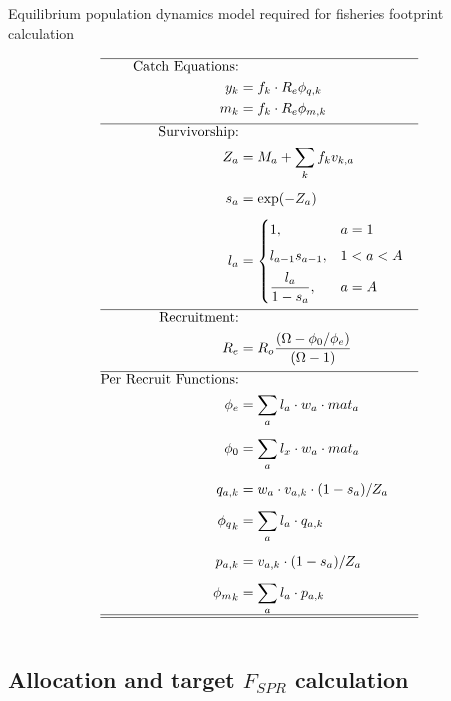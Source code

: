 \documentclass[12pt,letterpaper]{article}
\begin{document}
\begin{table}[h]
\centering
\caption{Equilibrium population dynamics model required for fisheries footprint calculation}\label{tab:equilibrium_model} 
\tableEq
	\large
    \begin{align}
           \hline
        \mbox{Catch Equations:} \nonumber \\
        	y_{k} &=  f_{k} \cdot R_{e} \phi_{q,k}  \label{T2.1}\\
        	m_{k} &=  f_{k} \cdot R_{e} \phi_{m,k}   \label{T2.2}\\[1ex]
        \hline
        \mbox{Survivorship:} \nonumber \\
        	Z_a &= M_a + \sum_k f_k v_{k,a} \label{T2.3}\\[1ex]
        	s_a &= \exp(-Z_a) \label{T2.4}\\[1ex]
        	l_a &= \begin{cases}
				1,  & a = 1\\[1ex]
				l_{a-1} s_{a-1}, & 1<a<A\\[1ex]
				\dfrac{l_{a}}{1 - s_{a}}, & a = A
			\end{cases} \label{T2.5}\\[1ex]        	
        \hline
        \mbox{Recruitment:} \nonumber \\
        	R_e &= R_o \frac{(\Omega-\phi_{0}/\phi_{e})}{(\Omega - 1)}\label{T2.6}\\[1ex]   
        \hline
        \mbox{Per Recruit Functions:} \nonumber \\
        	\phi_{e} &= \sum_a l_a \cdot w_a \cdot mat_a\label{T2.7}\\[1ex]
        	\phi_{0} &= \sum_a l_x \cdot w_a \cdot mat_a\label{T2.8}\\[1ex]
        	q_{a,k} &= w_a \cdot v_{a,k} \cdot (1-s_a)/ Z_a \label{T2.9}\\[1ex]
			{\phi_{q}}_{k} &= \sum_a l_a \cdot q_{a,k} \label{T2.10}\\[1ex]
			p_{a,k} &= v_{a,k} \cdot (1-s_a)/ Z_a \label{T2.11}\\[1ex]
			{\phi_{m}}_{k} &= \sum_a l_a \cdot p_{a,k} \label{T2.12}\\       
        \hline \hline \nonumber
    \end{align}
\end{table}





\subsection{Allocation and target $F_{SPR}$ calculation}
\end{document}
